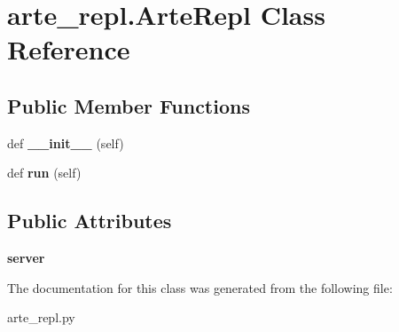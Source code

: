 \section{arte\+\_\+repl.\+Arte\+Repl Class Reference}
\label{classarte__repl_1_1_arte_repl}
\subsection*{Public Member Functions}
\begin{DoxyCompactItemize}
\item 
def {\bfseries \+\_\+\+\_\+init\+\_\+\+\_\+} (self)\label{classarte__repl_1_1_arte_repl_a17500603781db1fef6797236420c83aa}

\item 
def {\bfseries run} (self)\label{classarte__repl_1_1_arte_repl_a4466fa89561fde1c11e74b3bfb9b7ecb}

\end{DoxyCompactItemize}
\subsection*{Public Attributes}
\begin{DoxyCompactItemize}
\item 
{\bfseries server}\label{classarte__repl_1_1_arte_repl_a35d716570f050ca955dd58bcc3f6256a}

\end{DoxyCompactItemize}


The documentation for this class was generated from the following file\+:\begin{DoxyCompactItemize}
\item 
arte\+\_\+repl.\+py\end{DoxyCompactItemize}
